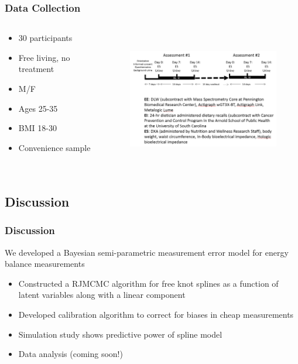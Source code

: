 \documentclass[handout]{beamer}\usepackage[]{graphicx}\usepackage[]{color}
\begin{document}
\begin{frame}
\frametitle{Data Collection}
\begin{columns}
\begin{column}{0.3\textwidth}
  \begin{itemize}
  \item
  30 participants
  \item
  Free living, no treatment
  \item
  M/F
  \item
  Ages 25-35
  \item
  BMI 18-30
  \item
  Convenience sample
\end{itemize}
\end{column}
\begin{column}{0.7\textwidth}
\begin{figure}
\centering
\includegraphics[height=6cm,width=8cm]{studydesign}
\end{figure}
\end{column}
\end{columns}

\end{frame}


\subsection{Discussion}

\begin{frame}
\frametitle{Discussion}
We developed a Bayesian semi-parametric measurement error model for energy balance measurements

\begin{itemize}
\item
Constructed a RJMCMC algorithm for free knot splines as a function of latent variables along with a linear component
\item
Developed calibration algorithm to correct for biases in cheap measurements
\item
Simulation study shows predictive power of spline model
\item
Data analysis (coming soon!)
\end{itemize}

\end{frame}
\end{document}
